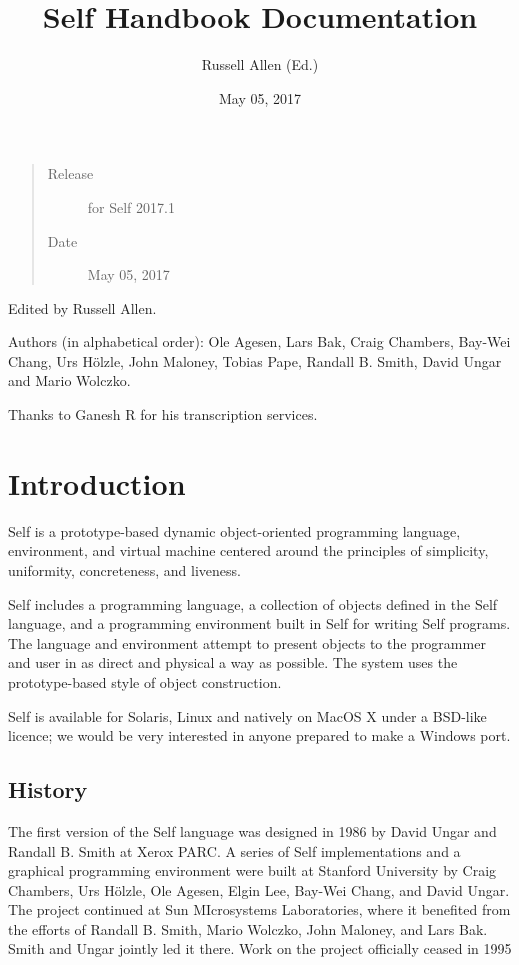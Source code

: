 \documentclass[letterpaper,10pt,english]{sphinxmanual}
\title{Self Handbook Documentation}
\date{May 05, 2017}
\author{Russell Allen (Ed.)}
\begin{document}
\maketitle
\sphinxtableofcontents
{}\label{\detokenize{index::doc}}

\begin{quote}\begin{description}
\item[{Release}] \leavevmode
for Self 2017.1

\item[{Date}] \leavevmode
May 05, 2017

\end{description}\end{quote}

Edited by Russell Allen.

Authors (in alphabetical order): Ole Agesen, Lars Bak, Craig Chambers, Bay-Wei Chang, Urs Hölzle, John Maloney, Tobias Pape, Randall B. Smith, David Ungar and Mario Wolczko.

Thanks to Ganesh R for his transcription services.


\chapter{Introduction}
\label{\detokenize{intro:introduction}}\label{\detokenize{intro::doc}}\label{\detokenize{intro:the-self-handbook}}
Self is a prototype-based dynamic object-oriented programming language, environment, and virtual machine centered around the principles of simplicity, uniformity, concreteness, and liveness.

Self includes a programming language, a collection of objects defined in the Self language, and a programming environment built in Self for writing Self programs. The language and environment attempt to present objects to the programmer and user in as direct and physical a way as possible. The system uses the prototype-based style of object construction.

Self is available for Solaris, Linux and natively on MacOS X under a BSD-like licence; we would be very interested in anyone prepared to make a Windows port.


\section{History}
\label{\detokenize{intro:history}}
The first version of the Self language was designed in 1986 by David Ungar and Randall B. Smith at Xerox PARC. A series of Self implementations and a graphical programming environment were built at Stanford University by Craig Chambers, Urs Hölzle, Ole Agesen, Elgin Lee, Bay-Wei Chang, and David Ungar. The project continued at Sun MIcrosystems Laboratories, where it benefited from the efforts of Randall B. Smith, Mario Wolczko, John Maloney, and Lars Bak. Smith and Ungar jointly led it there. Work on the project officially ceased in 1995
\end{document}
